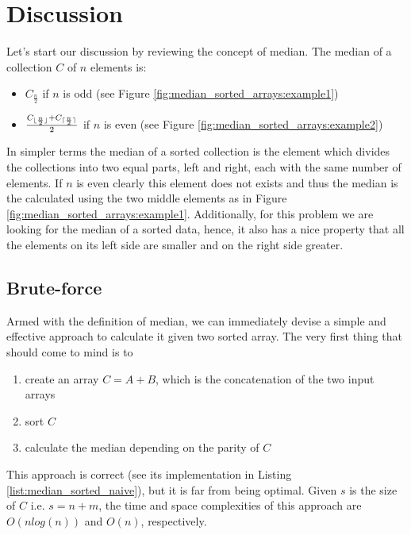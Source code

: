 \section{Discussion}
\label{median_sorted_arrays:sec:discussion}
Let's start our discussion by reviewing the concept of median.
The median of a collection $C$ of $n$ elements is:
\begin{itemize}
	\item $C_{\frac{n}{2}}$ if $n$ is odd (see Figure \ref{fig:median_sorted_arrays:example1})
	\item $\frac{C_{\lfloor\frac{n}{2}\rfloor}+C_{\lceil\frac{n}{2}\rceil}}{2}$ if $n$ is even (see Figure \ref{fig:median_sorted_arrays:example2})
\end{itemize}
In simpler terms the median of a sorted collection is the element which  divides the collections into two equal parts, left and right, each with the same number of elements. If $n$ is even clearly this element does not exists and thus the median is the calculated using the two middle elements as in Figure \ref{fig:median_sorted_arrays:example1}. Additionally, for this problem we are looking for the median of a sorted data, hence, it also has a nice property that all the elements on its left side are smaller and on the right side greater. 

\subsection{Brute-force}
\label{median_sorted_arrays:sec:bruteforce}
Armed with the definition of median, we can immediately devise a simple and effective approach to calculate it given two sorted array. The very first thing that should come to mind is to 
\begin{enumerate}
	\item  create an array $C = A+B$, which is the concatenation of the two input arrays
	\item sort $C$
	\item calculate the median depending on the parity of $C$
\end{enumerate}

This approach is correct (see its implementation in Listing \ref{list:median_sorted_naive}), but it is far from being optimal. Given $s$ is the size of $C$ i.e. $s=n+m$, the time and space complexities of this approach are $O(nlog(n))$ and $O(n)$, respectively.




